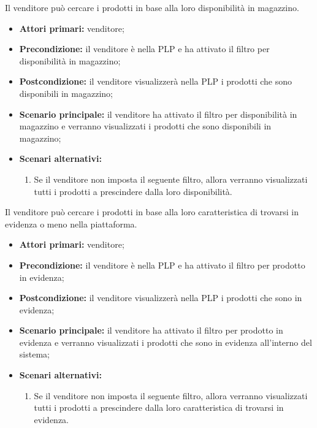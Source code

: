 \label{filtro-prodotti-venditore.magazzino}

Il venditore può cercare i prodotti in base alla loro disponibilità in magazzino.
\begin{itemize}
	\item \textbf{Attori primari:} venditore;
	\item \textbf{Precondizione:} il venditore è nella PLP e ha attivato il filtro per disponibilità in magazzino;
	\item \textbf{Postcondizione:} il venditore visualizzerà nella PLP i prodotti che sono disponibili in magazzino;
	\item \textbf{Scenario principale:} il venditore ha attivato il filtro per disponibilità in magazzino e verranno visualizzati i prodotti che sono disponibili in magazzino;
	\item \textbf{Scenari alternativi:}
	\begin{enumerate}[label=\lett]
		\item Se il venditore non imposta il seguente filtro, allora verranno visualizzati tutti i prodotti a prescindere dalla loro disponibilità.
	\end{enumerate}
\end{itemize}

\label{filtro-prodotti-venditore.evidenza}

Il venditore può cercare i prodotti in base alla loro caratteristica di trovarsi in evidenza o meno nella piattaforma.
\begin{itemize}
	\item \textbf{Attori primari:} venditore;
	\item \textbf{Precondizione:} il venditore è nella PLP e ha attivato il filtro per prodotto in evidenza;
	\item \textbf{Postcondizione:} il venditore visualizzerà nella PLP i prodotti che sono in evidenza;
	\item \textbf{Scenario principale:} il venditore ha attivato il filtro per prodotto in evidenza e verranno visualizzati i prodotti che sono in evidenza all'interno del sistema;
	\item \textbf{Scenari alternativi:}
	\begin{enumerate}[label=\lett]
		\item Se il venditore non imposta il seguente filtro, allora verranno visualizzati tutti i prodotti a prescindere dalla loro caratteristica di trovarsi in evidenza.
	\end{enumerate}
\end{itemize}